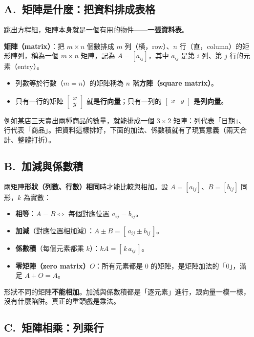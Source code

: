\documentclass[11pt]{article}
\begin{document}
\subsection*{\sffamily A.\ 矩陣是什麼：把資料排成表格}

跳出方程組，矩陣本身就是一個有用的物件——\textbf{一張資料表}。

\textbf{矩陣（matrix）}：把 $m\times n$ 個數排成 $m$ 列（橫，row）、$n$ 行（直，column）的矩形陣列，稱為一個 $m\times n$ 矩陣，記為 $A=[a_{ij}]$，其中 $a_{ij}$ 是第 $i$ 列、第 $j$ 行的元素（entry）。

\begin{itemize}\setlength{\itemsep}{1pt}
\item 列數等於行數（$m=n$）的矩陣稱為 $n$ 階\textbf{方陣（square matrix）}。
\item 只有一行的矩陣 $\begin{bmatrix} x\\ y \end{bmatrix}$ 就是\textbf{行向量}；只有一列的 $\begin{bmatrix} x & y \end{bmatrix}$ 是\textbf{列向量}。
\end{itemize}
例如某店三天賣出兩種商品的數量，就能排成一個 $3\times2$ 矩陣：列代表「日期」、行代表「商品」。把資料這樣排好，下面的加法、係數積就有了現實意義（兩天合計、整體打折）。

\subsection*{\sffamily B.\ 加減與係數積}

兩矩陣\textbf{形狀（列數、行數）相同}時才能比較與相加。設 $A=[a_{ij}]$、$B=[b_{ij}]$ 同形，$k$ 為實數：

\begin{itemize}\setlength{\itemsep}{1pt}
\item \textbf{相等}：$A=B\iff$ 每個對應位置 $a_{ij}=b_{ij}$。
\item \textbf{加減}（對應位置相加減）：$A\pm B=[\,a_{ij}\pm b_{ij}\,]$。
\item \textbf{係數積}（每個元素都乘 $k$）：$kA=[\,k\,a_{ij}\,]$。
\item \textbf{零矩陣（zero matrix）$O$}：所有元素都是 $0$ 的矩陣，是矩陣加法的「$0$」，滿足 $A+O=A$。
\end{itemize}
形狀不同的矩陣\textbf{不能相加}。加減與係數積都是「逐元素」進行，跟向量一模一樣，沒有什麼陷阱。真正的重頭戲是乘法。

\subsection*{\sffamily C.\ 矩陣相乘：列乘行}
\end{document}
